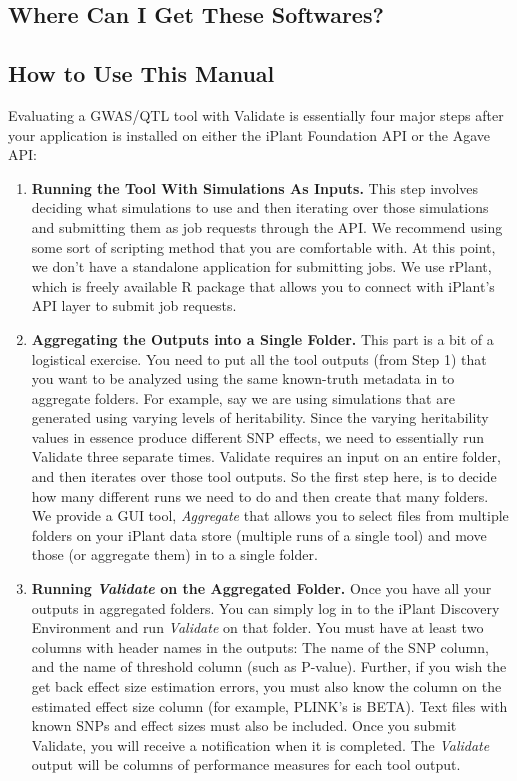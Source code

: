 \documentclass[twoside,a4paper]{refart}
\begin{document}
\subsection{Where Can I Get These Softwares?}

\subsection{How to Use This Manual}

Evaluating a GWAS/QTL tool with Validate is essentially four major steps after your application is installed on either the iPlant Foundation API or the Agave API:
\begin{enumerate}
\item \textbf{Running the Tool With Simulations As Inputs.}
This step involves deciding what simulations to use and then iterating over those simulations and submitting them as job requests through the API. We recommend using some sort of scripting method that you are comfortable with. At this point, we don't have a standalone application for submitting jobs. We use rPlant, which is freely available R package that allows you to connect with iPlant's API layer to submit job requests.
\item \textbf{Aggregating the Outputs into a Single Folder.}
This part is a bit of a logistical exercise. You need to put all the tool outputs (from Step 1) that you want to be analyzed using the same known-truth metadata in to aggregate folders. For example, say we are using simulations that are generated using varying levels of heritability. Since the varying heritability values in essence produce different SNP effects, we need to essentially run Validate three separate times. Validate requires an input on an entire folder, and then iterates over those tool outputs. So the first step here, is to decide how many different runs we need to do and then create that many folders. We provide a GUI tool, \textit{Aggregate} that allows you to select files from multiple folders on your iPlant data store (multiple runs of a single tool) and move those (or aggregate them) in to a single folder.
\item \textbf{Running \textit{Validate} on the Aggregated Folder.}
Once you have all your outputs in aggregated folders. You can simply log in to the iPlant Discovery Environment and run \textit{Validate} on that folder. You must have at least two columns with header names in the outputs: The name of the SNP column, and the name of threshold column (such as P-value). Further, if you wish the get back effect size estimation errors, you must also know the column on the estimated effect size column (for example, PLINK's is BETA). Text files with known SNPs and effect sizes must also be included. Once you submit Validate, you will receive a notification when it is completed. The \textit{Validate} output will be columns of performance measures for each tool output.

\end{enumerate}
\end{document}
